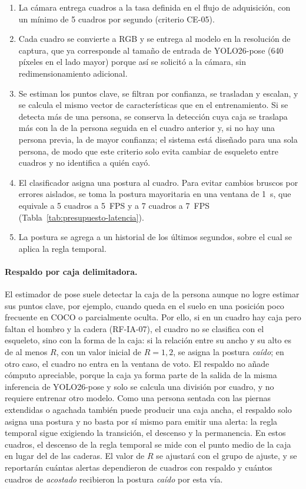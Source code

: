 \documentclass[12pt,a4paper,oneside]{book}
\theoremstyle{plain}
\theoremstyle{definition}
\theoremstyle{remark}
\begin{document}
\begin{enumerate}
  \item La cámara entrega cuadros a la tasa definida en el flujo de adquisición, con un mínimo de 5 cuadros por segundo (criterio CE-05).
  \item Cada cuadro se convierte a RGB y se entrega al modelo en la resolución de captura, que ya corresponde al tamaño de entrada de YOLO26-pose (640 píxeles en el lado mayor) porque así se solicitó a la cámara, sin redimensionamiento adicional.
  \item Se estiman los puntos clave, se filtran por confianza, se trasladan y escalan, y se calcula el mismo vector de características que en el entrenamiento. Si se detecta más de una persona, se conserva la detección cuya caja se traslapa más con la de la persona seguida en el cuadro anterior y, si no hay una persona previa, la de mayor confianza; el sistema está diseñado para una sola persona, de modo que este criterio solo evita cambiar de esqueleto entre cuadros y no identifica a quién cayó.
  \item El clasificador asigna una postura al cuadro. Para evitar cambios bruscos por errores aislados, se toma la postura mayoritaria en una ventana de 1~s, que equivale a 5 cuadros a 5~FPS y a 7 cuadros a 7~FPS (Tabla~\ref{tab:presupuesto-latencia}).
  \item La postura se agrega a un historial de los últimos segundos, sobre el cual se aplica la regla temporal.
\end{enumerate}

\paragraph{Respaldo por caja delimitadora.} El estimador de pose suele detectar la caja de la persona aunque no logre estimar sus puntos clave, por ejemplo, cuando queda en el suelo en una posición poco frecuente en COCO o parcialmente oculta. Por ello, si en un cuadro hay caja pero faltan el hombro y la cadera (RF-IA-07), el cuadro no se clasifica con el esqueleto, sino con la forma de la caja: si la relación entre su ancho y su alto es de al menos $R$, con un valor inicial de $R = 1{,}2$, se asigna la postura \textit{caído}; en otro caso, el cuadro no entra en la ventana de voto. El respaldo no añade cómputo apreciable, porque la caja ya forma parte de la salida de la misma inferencia de YOLO26-pose y solo se calcula una división por cuadro, y no requiere entrenar otro modelo. Como una persona sentada con las piernas extendidas o agachada también puede producir una caja ancha, el respaldo solo asigna una postura y no basta por sí mismo para emitir una alerta: la regla temporal sigue exigiendo la transición, el descenso y la permanencia. En estos cuadros, el descenso de la regla temporal se mide con el punto medio de la caja en lugar del de las caderas. El valor de $R$ se ajustará con el grupo de ajuste, y se reportarán cuántas alertas dependieron de cuadros con respaldo y cuántos cuadros de \textit{acostado} recibieron la postura \textit{caído} por esta vía.
\end{document}

